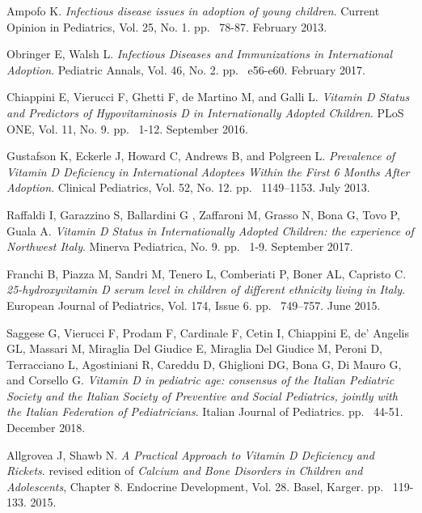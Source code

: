 \begin{thebibliography}{50}
  Ampofo K.
  \textit{Infectious disease issues in adoption of young children}.
  Current Opinion in Pediatrics, Vol. 25, No. 1.
  pp. ~78-87.
  February 2013.
  
  Obringer E, Walsh L.
  \textit{Infectious Diseases and Immunizations in International Adoption}.
  Pediatric Annals, Vol. 46, No. 2.
  pp. ~e56-e60.
  February 2017.
  
  Chiappini E, Vierucci F, Ghetti F, de Martino M, and Galli L.
  \textit{Vitamin D Status and Predictors of Hypovitaminosis D in Internationally Adopted Children}.
  PLoS ONE, Vol. 11, No. 9.
  pp. ~1-12.
  September 2016.
  
  Gustafson K, Eckerle J, Howard C, Andrews B, and Polgreen L.
  \textit{Prevalence of Vitamin D Deficiency in International Adoptees Within the First 6 Months After Adoption}.
  Clinical Pediatrics, Vol. 52, No. 12.
  pp. ~1149–1153.
  July 2013.
  
  Raffaldi I, Garazzino S, Ballardini G , Zaffaroni M, Grasso N, Bona G, Tovo P, Guala A.
  \textit{Vitamin D Status in Internationally Adopted Children: the experience of Northwest Italy}.
  Minerva Pediatrica, No. 9.
  pp. ~1-9.
  September 2017.
  
  Franchi B, Piazza M, Sandri M, Tenero L, Comberiati P, Boner AL, Capristo C.
  \textit{25-hydroxyvitamin D serum level in children of different ethnicity living in Italy}.
  European Journal of Pediatrics, Vol. 174, Issue 6.
  pp. ~749–757.
  June 2015.
  
  Saggese G, Vierucci F, Prodam F, Cardinale F, Cetin I, Chiappini E, de’ Angelis GL, Massari M, Miraglia Del Giudice E, Miraglia Del Giudice M, Peroni D, Terracciano L, Agostiniani R, Careddu D, Ghiglioni DG, Bona G, Di Mauro G, and Corsello G.
  \textit{Vitamin D in pediatric age: consensus of the Italian Pediatric Society and the Italian Society of Preventive and Social Pediatrics, jointly with the Italian Federation of Pediatricians}.
  Italian Journal of Pediatrics.
  pp. ~44-51.
  December 2018.
  
  Allgrovea J, Shawb N.
  \textit{A Practical Approach to Vitamin D Deficiency and Rickets}.
   revised edition of \textit{Calcium and Bone Disorders in Children and Adolescents}, Chapter 8.
  Endocrine Development, Vol. 28.
  Basel, Karger.
  pp. ~119-133.
  2015.
  

\end{thebibliography}
